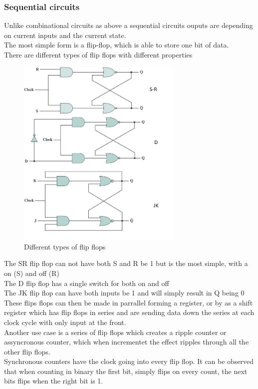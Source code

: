 \documentclass[12pt, a4paper]{article}
\begin{document}
				\subsubsection{Sequential circuits}
					Unlike combinational circuits as above a sequential circuits ouputs are depending on current inputs and the current state.\\
					The most simple form is a flip-flop, which is able to store one bit of data.\\
					There are different types of flip flops with different properties
					\begin{figure}[h!]
						\includegraphics[width=300px]{assets/flipFlops.png}
						\centering
						\caption{Different types of flip flops}
					\end{figure}
					The SR flip flop can not have both S and R be 1 but is the most simple, with a on (S) and off (R)\\
					The D flip flop has a single switch for both on and off\\
					The JK flip flop can have both inputs be 1 and will simply result in Q being 0\\
					These flips flops can then be made in parrallel forming a register, or by as a shift register which has flip flops in series and are sending data down the series at each clock cycle with only input at the front.\\
					Another use case is a series of flip flops which creates a ripple counter or assyncronous counter, which when incrementet the effect ripples through all the other flip flops.\\
					Synchronous counters have the clock going into every flip flop. It can be observed that when counting in binary the first bit, simply flips on every count, the next bits flips when the right bit is 1.\\
\end{document}
